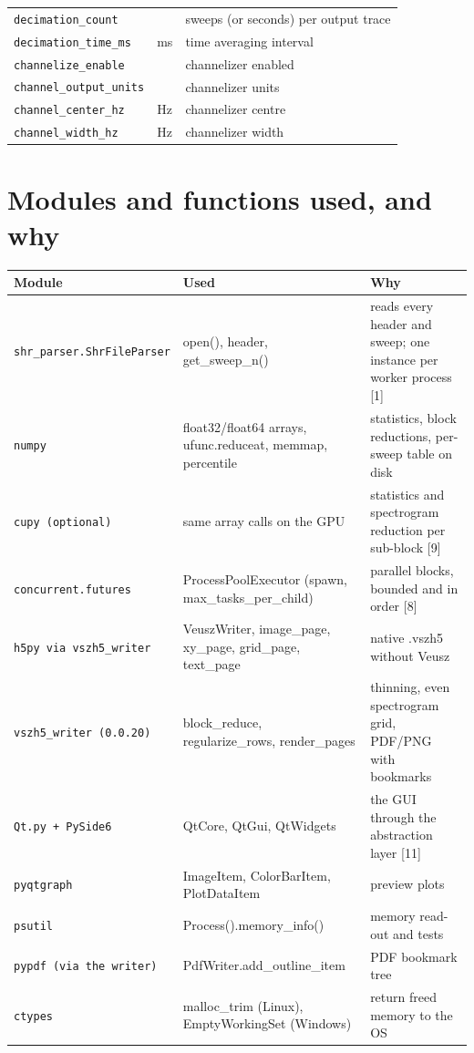 \documentclass[11pt,a4paper]{article}
\begin{document}
\begin{longtable}{p{4.4cm}p{2.2cm}p{8.6cm}}
\texttt{decimation\_\allowbreak{}count} &  & sweeps (or seconds) per output trace\\
\texttt{decimation\_\allowbreak{}time\_\allowbreak{}ms} & ms & time averaging interval\\
\texttt{channelize\_\allowbreak{}enable} &  & channelizer enabled\\
\texttt{channel\_\allowbreak{}output\_\allowbreak{}units} &  & channelizer units\\
\texttt{channel\_\allowbreak{}center\_\allowbreak{}hz} & Hz & channelizer centre\\
\texttt{channel\_\allowbreak{}width\_\allowbreak{}hz} & Hz & channelizer width\\
\bottomrule
\end{longtable}
\section{Modules and functions used, and why}
\begin{longtable}{p{3.8cm}p{5.2cm}p{6.4cm}}
\toprule
\textbf{Module} & \textbf{Used} & \textbf{Why}\\
\midrule
\endhead
\texttt{shr\_\allowbreak{}parser.ShrFileParser} & open(), header, get\_sweep\_n() & reads every header and sweep; one instance per worker process [1]\\
\texttt{numpy} & float32/float64 arrays, ufunc.reduceat, memmap, percentile & statistics, block reductions, per-sweep table on disk\\
\texttt{cupy (optional)} & same array calls on the GPU & statistics and spectrogram reduction per sub-block [9]\\
\texttt{concurrent.futures} & ProcessPoolExecutor (spawn, max\_tasks\_per\_child) & parallel blocks, bounded and in order [8]\\
\texttt{h5py via vszh5\_\allowbreak{}writer} & VeuszWriter, image\_page, xy\_page, grid\_page, text\_page & native .vszh5 without Veusz\\
\texttt{vszh5\_\allowbreak{}writer (0.0.20)} & block\_reduce, regularize\_rows, render\_pages & thinning, even spectrogram grid, PDF/PNG with bookmarks\\
\texttt{Qt.py + PySide6} & QtCore, QtGui, QtWidgets & the GUI through the abstraction layer [11]\\
\texttt{pyqtgraph} & ImageItem, ColorBarItem, PlotDataItem & preview plots\\
\texttt{psutil} & Process().memory\_info() & memory read-out and tests\\
\texttt{pypdf (via the writer)} & PdfWriter.add\_outline\_item & PDF bookmark tree\\
\texttt{ctypes} & malloc\_trim (Linux), EmptyWorkingSet (Windows) & return freed memory to the OS\\
\bottomrule
\end{longtable}
\end{document}
